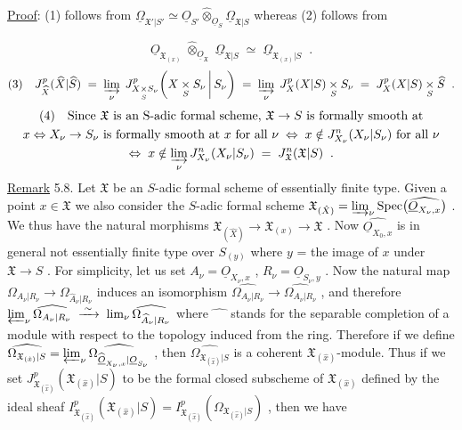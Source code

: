 \underline{Proof}: (1) follows from $\underline{\Omega}_{\mathfrak{X}'|S'} \simeq \underline{O}_{S'} \widehat{\otimes}_{\underline{O}_S} \underline{\Omega}_{\mathfrak{X}|S}$ whereas (2) follows from

\begin{equation*}
\underline{O}_{\mathfrak{X}_{(x)}} \;\widehat{\otimes}_{\underline{O}_{\mathfrak{X}}}\; \underline{\Omega}_{\mathfrak{X}|S} \;\simeq\; \underline{\Omega}_{\mathfrak{X}_{(x)}|S} \;\;.
\end{equation*}
\begin{equation*}
(3)\quad J^{p}_{\widehat{X}}(\widehat{X}|\widehat{S}) \;=\; \varinjlim_{\nu} \; J^{p}_{X \underset{S}{\times} S_\nu}\!\left(X \underset{S}{\times} S_\nu \,\middle|\, S_\nu\right) \;=\; \varinjlim_{\nu} \; J^{p}_{X}(X|S) \underset{S}{\times} S_\nu \;=\; J^{p}_{X}(X|S) \underset{S}{\times} \widehat{S} \;\;.
\end{equation*}
\begin{multline*}
(4)\quad \text{Since } \mathfrak{X} \text{ is an S-adic formal scheme, } \mathfrak{X} \to S \text{ is formally smooth at}\\ x \Leftrightarrow X_\nu \to S_\nu \text{ is formally smooth at } x \text{ for all } \nu \;\Leftrightarrow\; x \notin J^{n}_{X_\nu}(X_\nu|S_\nu) \text{ for all } \nu\\ \Leftrightarrow\; x \notin \varinjlim_{\nu} J^{n}_{X_\nu}(X_\nu|S_\nu) \;=\; J^{n}_{\mathfrak{X}}(\mathfrak{X}|S) \;\;.
\end{multline*}
\underline{Remark} 5.8. Let $\mathfrak{X}$ be an $S$-adic formal scheme of essentially finite type. Given a point $x \in \mathfrak{X}$ we also consider the $S$-adic formal scheme $\mathfrak{X}_{(\hat{X})} = \varinjlim_{\nu} \mathrm{Spec}\big(\widehat{\underline{O}_{X_\nu,x}}\big)$ . We thus have the natural morphisms $\mathfrak{X}_{(\hat{X})} \to \mathfrak{X}_{(x)} \to \mathfrak{X}$ . Now $\widehat{\underline{O}_{X_0,x}}$ is in general not essentially finite type over $S_{(y)}$ where $y$ = the image of $x$ under $\mathfrak{X} \to S$ . For simplicity, let us set $A_\nu = \underline{O}_{X_\nu,x}$ , $R_\nu = \underline{O}_{S_\nu,y}$ . Now the natural map $\Omega_{A_\nu|R_\nu} \to \Omega_{\widehat{A}_\nu|R_\nu}$ induces an isomorphism $\widehat{\Omega_{A_\nu|R_\nu}} \to \widehat{\Omega_{A_\nu|R_\nu}}$ , and therefore $\varprojlim_{\nu} \widehat{\Omega_{A_\nu|R_\nu}} \;\xrightarrow{\;\sim\;}\; \lim_{\nu} \widehat{\Omega_{\widehat{A}_\nu|R_\nu}}$ where $\widehat{\phantom{xx}}$ stands for the separable completion of a module with respect to the topology induced from the ring. Therefore if we define $\widehat{\Omega_{\mathfrak{X}_{(\hat{x})}|S}} = \varprojlim_{\nu} \widehat{\Omega_{\widehat{\underline{O}}_{X_\nu,x}|\underline{O}_{S_\nu}}}$ , then $\widehat{\Omega_{\mathfrak{X}_{(\hat{x})}|S}}$ is a coherent $\mathfrak{X}_{(\hat{x})}$-module. Thus if
we set $J^{p}_{\mathfrak{X}_{(\hat{x})}}(\mathfrak{X}_{(\hat{x})}|S)$ to be the formal closed subscheme of $\mathfrak{X}_{(\hat{x})}$ defined by the ideal sheaf $I^{p}_{\mathfrak{X}_{(\hat{x})}}(\mathfrak{X}_{(\hat{x})}|S) = I^{p}_{\mathfrak{X}_{(\hat{x})}}(\Omega_{\mathfrak{X}_{(\hat{x})}|S})$ , then we have

